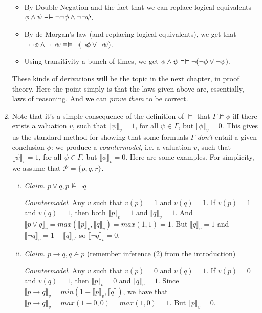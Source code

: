 \begin{enumerate}[\thesection.1]
\begin{itemize}
			\item By Double Negation and the fact that we can replace logical equivalents $\phi\land\psi\equi \neg\neg\phi\land\neg\neg\psi$. 			
			\item By de Morgan's law (and replacing logical equivalents), we get that $ \neg\neg\phi\land\neg\neg\psi\equi \neg(\neg\phi\lor\neg\psi)$.
					
			\item Using transitivity a bunch of times, we get  $\phi\land\psi\equi\neg(\neg\phi\lor\neg\psi)$.		
		\end{itemize}
		These kinds of derivations will be the topic in the next chapter, in proof theory. Here the point simply is that the laws given above are, essentially, laws of reasoning. And we can \emph{prove them} to be correct. 
				
		\item Note that it's a simple consequence of the definition of $\vDash$ that $\Gamma\nvDash\phi$ iff there exists a valuation $v$, such that $\llbracket\psi\rrbracket_v=1$, for all $\psi\in\Gamma$, but $\llbracket\phi\rrbracket_v=0$. This gives us the standard method for showing that some formuals $\Gamma$ \emph{don't} entail a given conclusion $\phi$: we produce a \emph{countermodel}, i.e. a valuation $v$, such that $\llbracket\psi\rrbracket_v=1$, for all $\psi\in\Gamma$, but $\llbracket\phi\rrbracket_v=0$. Here are some examples. For simplicity, we assume that $\mathcal{P}=\{p,q,r\}$.
		
		\begin{enumerate}[(i)]
		
			\item \emph{Claim}. $p\lor q, p\nvDash \neg q$
			
			\emph{Countermodel}. Any $v$ such that $v(p)=1$ and $v(q)=1$. If $v(p)=1$ and $v(q)=1$, then both $\llbracket p\rrbracket_v=1$ and $\llbracket q\rrbracket_v=1$. And $\llbracket p\lor q\rrbracket_v=max(\llbracket p\rrbracket_v,\llbracket q\rrbracket_v)=max(1, 1)=1$. But $\llbracket q\rrbracket_v=1$ and $\llbracket \neg q\rrbracket_v=1-\llbracket q\rrbracket_v$, so $\llbracket \neg q\rrbracket_v=0$.
		
			\item \emph{Claim}. $p\to q, q\nvDash p$  (remember inference (2) from the introduction)
			
			\emph{Countermodel}. Any $v$ such that $v(p)=0$ and $v(q)=1$. If $v(p)=0$ and $v(q)=1$, then $\llbracket p\rrbracket_v=0$ and $\llbracket q\rrbracket_v=1$. Since $\llbracket p\to q\rrbracket_v=min(1-\llbracket p\rrbracket_v, \llbracket q\rrbracket)$, we have that $\llbracket p\to q\rrbracket_v=max(1-0,0)=max(1,0)=1$. But $\llbracket p\rrbracket_v=0$.
		

\end{enumerate}
\end{enumerate}
